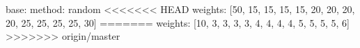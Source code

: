 base:
  method: random
<<<<<<< HEAD
  weights: [50, 15, 15, 15, 15, 20, 20, 20, 20, 25, 25, 25, 25, 30]
=======
  weights: [10, 3, 3, 3, 3, 4, 4, 4, 4, 5, 5, 5, 5, 6]
>>>>>>> origin/master
